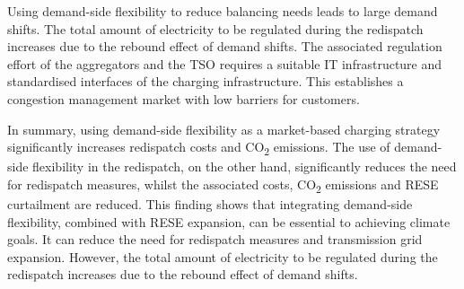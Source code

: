 Using demand-side flexibility to reduce balancing needs leads to large demand shifts. 
The total amount of electricity to be regulated during the redispatch increases due to the rebound effect of demand shifts. The associated regulation effort of the aggregators and the \ac{TSO} requires a suitable IT infrastructure and standardised interfaces of the charging infrastructure. This establishes a congestion management market with low barriers for customers.


In summary, using demand-side flexibility as a market-based charging strategy significantly increases redispatch costs and CO\textsubscript{2} emissions. The use of demand-side flexibility in the redispatch, on the other hand, significantly reduces the need for redispatch measures, whilst the associated costs, CO\textsubscript{2} emissions and \ac{RESE} curtailment are reduced. This finding shows that integrating demand-side flexibility, combined with \ac{RESE} expansion, can be essential to achieving climate goals. It can reduce the need for redispatch measures and transmission grid expansion. However, the total amount of electricity to be regulated during the redispatch increases due to the rebound effect of demand shifts. 